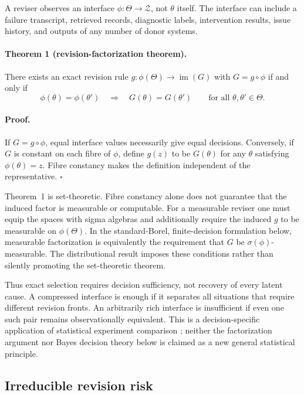 A reviser observes an interface $\phi:\Theta\to\mathcal Z$, not $\theta$
itself. The interface can include a failure transcript, retrieved records,
diagnostic labels, intervention results, issue history, and outputs of any
number of donor systems.

\paragraph{Theorem 1 (revision-factorization theorem).}
There exists an exact revision rule $g:\phi(\Theta)\to\operatorname{im}(G)$
with $G=g\circ\phi$ if and only if
\[
  \phi(\theta)=\phi(\theta')\quad\Longrightarrow\quad
  G(\theta)=G(\theta')
  \qquad\text{for all }\theta,\theta'\in\Theta.
\]

\paragraph{Proof.}
If $G=g\circ\phi$, equal interface values necessarily give equal decisions.
Conversely, if $G$ is constant on each fibre of $\phi$, define $g(z)$ to be
$G(\theta)$ for any $\theta$ satisfying $\phi(\theta)=z$. Fibre constancy
makes the definition independent of the representative. \hfill$\square$

Theorem~1 is set-theoretic.  Fibre constancy alone does not guarantee that the
induced factor is measurable or computable.  For a measurable reviser one must
equip the spaces with sigma algebras and additionally require the induced $g$
to be measurable on $\phi(\Theta)$.  In the standard-Borel, finite-decision
formulation below, measurable factorization is equivalently the requirement
that $G$ be $\sigma(\phi)$-measurable.  The distributional result imposes these
conditions rather than silently promoting the set-theoretic theorem.

Thus exact selection requires decision sufficiency, not recovery of every
latent cause. A compressed interface is enough if it separates all situations
that require different revision fronts. An arbitrarily rich interface is
insufficient if even one such pair remains observationally equivalent. This is
a decision-specific application of statistical experiment comparison
\cite{blackwell1953}; neither the factorization argument nor Bayes decision
theory below is claimed as a new general statistical principle.

\subsection{Irreducible revision risk}

